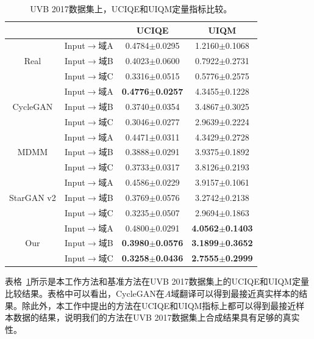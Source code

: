 \begin{table}[htp]
  \centering
  \caption{UVB 2017数据集上，UCIQE和UIQM定量指标比较。}
    \begin{tabular}{c|c|cc}
    \toprule
    \multicolumn{2}{c|}{} & \multicolumn{1}{c}{UCIQE} & UIQM \\
    \midrule
    \multirow{3}[2]{*}{Real} & Input$\rightarrow$域A & 0.4784$\pm$0.0295 & 1.2160$\pm$0.1068 \\
                             & Input$\rightarrow$域B & 0.4023$\pm$0.0600 & 0.7922$\pm$0.2731 \\
                             & Input$\rightarrow$域C & 0.3316$\pm$0.0515 & 0.5776$\pm$0.2575 \\
    \midrule
    \multirow{3}[2]{*}{CycleGAN} & Input$\rightarrow$域A & \textbf{0.4776$\pm$0.0257} & 4.3455$\pm$0.1228 \\
                                 & Input$\rightarrow$域B & 0.3740$\pm$0.0354 & 3.4867$\pm$0.3025 \\
                                 & Input$\rightarrow$域C & 0.3046$\pm$0.0277 & 2.9639$\pm$0.2224  \\
    \midrule
    \multirow{3}[2]{*}{MDMM} & Input$\rightarrow$域A & 0.4471$\pm$0.0311 & 4.3429$\pm$0.2728 \\
          & Input$\rightarrow$域B & 0.3888$\pm$0.0291 & 3.9375$\pm$0.1892 \\
          & Input$\rightarrow$域C & 0.3733$\pm$0.0317 & 3.8126$\pm$0.2193 \\
    \midrule
    \multirow{3}[2]{*}{StarGAN v2} &Input$\rightarrow$域A & 0.4586$\pm$0.0229 & 3.9157$\pm$0.1061 \\
          & Input$\rightarrow$域B & 0.3769$\pm$0.0576 & 3.2742$\pm$0.2138 \\
          & Input$\rightarrow$域C & 0.3235$\pm$0.0507 & 2.9694$\pm$0.1863 \\
    \midrule
    \multirow{3}[2]{*}{Our} & Input$\rightarrow$域A & 0.4800$\pm$0.0291 & \textbf{4.0562$\pm$0.1403} \\
          & Input$\rightarrow$域B & \textbf{0.3980$\pm$0.0576} & \textbf{3.1899$\pm$0.3652} \\
          & Input$\rightarrow$域C & \textbf{0.3258$\pm$0.0436} & \textbf{2.7555$\pm$0.2999} \\
    \bottomrule
    \end{tabular}%
  \label{tab:underwater_matric_uvb}%
\end{table}%

表格~\ref{tab:underwater_matric_uvb}所示是本工作方法和基准方法在UVB 2017数据集上的UCIQE和UIQM定量比较结果。表格中可以看出，CycleGAN在$A$域翻译可以得到最接近真实样本的结果。除此外，本工作中提出的方法在UCIQE和UIQM指标上都可以得到最接近样本数据的结果，说明我们的方法在UVB 2017数据集上合成结果具有足够的真实性。

